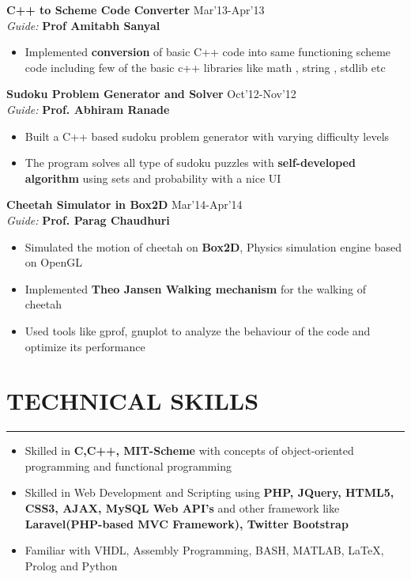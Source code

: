 \documentclass[11pt]{article} %
\begin{document}
\noindent \textbf{C++ to Scheme Code Converter} \hfill Mar'13-Apr'13\\
\textit{Guide:} \textbf{Prof Amitabh Sanyal}
\vspace{-3mm}
\begin{itemize}
\itemsep-0.3em
\item Implemented \textbf{conversion} of basic C++ code into same functioning scheme code including few of the basic c++ libraries like math , string , stdlib etc
\end{itemize}
\vspace{-1mm}

\noindent \textbf{Sudoku Problem Generator and Solver} \hfill Oct'12-Nov'12\\
\textit{Guide:} \textbf{Prof. Abhiram Ranade}
\vspace{-3mm}
\begin{itemize}
\itemsep-0.3em
\item Built a C++ based sudoku problem generator with varying difficulty levels
\item The program solves all type of sudoku puzzles with \textbf{self-developed algorithm} using sets and probability with a nice UI
\end{itemize}
\vspace{-1mm}

\noindent \textbf{Cheetah Simulator in Box2D} \hfill Mar'14-Apr'14\\
\textit{Guide:} \textbf{Prof. Parag Chaudhuri}
\vspace{-3mm}
\begin{itemize}
\itemsep-0.3em
\item Simulated the motion of cheetah on {\bf Box2D}, Physics simulation engine based on OpenGL
\item Implemented \textbf{Theo Jansen Walking mechanism} for the walking of cheetah
\item Used tools like gprof, gnuplot to analyze the behaviour of the code and optimize its performance
\end{itemize}
\vspace{-5mm}

\section*{TECHNICAL SKILLS}
\hrule
\medskip
\begin{itemize}
\itemsep-0.3em
\item Skilled in \textbf{C,C++, MIT-Scheme} with concepts of object-oriented programming and functional programming
\item Skilled in Web Development and Scripting using \textbf{PHP, JQuery,  HTML5, CSS3, AJAX, MySQL Web API’s} and other framework like \textbf{Laravel(PHP-based MVC Framework), Twitter Bootstrap}
\item Familiar with {VHDL, Assembly Programming, BASH, MATLAB,  \LaTeX, Prolog and Python}
\end{itemize}
\vspace{-5mm}
\end{document}
